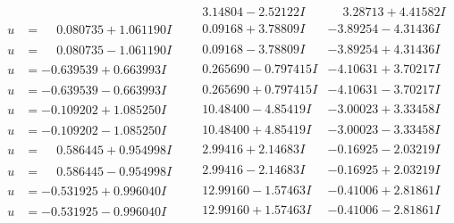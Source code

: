\documentclass[1p]{elsarticle_modified}
\theoremstyle{definition}
\begin{document}
$$\begin{array}{c|c|c}
 & \phantom{-}3.14804 - 2.52122 I & \phantom{-}3.28713 + 4.41582 I \\ \hline\begin{aligned}
u &= \phantom{-}0.080735 + 1.061190 I\end{aligned}
 & \phantom{-}0.09168 + 3.78809 I & -3.89254 - 4.31436 I \\ \hline\begin{aligned}
u &= \phantom{-}0.080735 - 1.061190 I\end{aligned}
 & \phantom{-}0.09168 - 3.78809 I & -3.89254 + 4.31436 I \\ \hline\begin{aligned}
u &= -0.639539 + 0.663993 I\end{aligned}
 & \phantom{-}0.265690 - 0.797415 I & -4.10631 + 3.70217 I \\ \hline\begin{aligned}
u &= -0.639539 - 0.663993 I\end{aligned}
 & \phantom{-}0.265690 + 0.797415 I & -4.10631 - 3.70217 I \\ \hline\begin{aligned}
u &= -0.109202 + 1.085250 I\end{aligned}
 & \phantom{-}10.48400 - 4.85419 I & -3.00023 + 3.33458 I \\ \hline\begin{aligned}
u &= -0.109202 - 1.085250 I\end{aligned}
 & \phantom{-}10.48400 + 4.85419 I & -3.00023 - 3.33458 I \\ \hline\begin{aligned}
u &= \phantom{-}0.586445 + 0.954998 I\end{aligned}
 & \phantom{-}2.99416 + 2.14683 I & -0.16925 - 2.03219 I \\ \hline\begin{aligned}
u &= \phantom{-}0.586445 - 0.954998 I\end{aligned}
 & \phantom{-}2.99416 - 2.14683 I & -0.16925 + 2.03219 I \\ \hline\begin{aligned}
u &= -0.531925 + 0.996040 I\end{aligned}
 & \phantom{-}12.99160 - 1.57463 I & -0.41006 + 2.81861 I \\ \hline\begin{aligned}
u &= -0.531925 - 0.996040 I\end{aligned}
 & \phantom{-}12.99160 + 1.57463 I & -0.41006 - 2.81861 I \\ \hline\begin{aligned}

\end{aligned}
\end{array}$$
\end{document}
